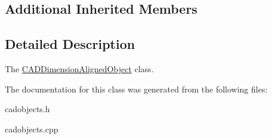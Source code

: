 \subsection*{Additional Inherited Members}


\subsection{Detailed Description}
The \hyperlink{class_c_a_d_dimension_aligned_object}{C\+A\+D\+Dimension\+Aligned\+Object} class. 

The documentation for this class was generated from the following files\+:\begin{DoxyCompactItemize}
\item 
cadobjects.\+h\item 
cadobjects.\+cpp\end{DoxyCompactItemize}
